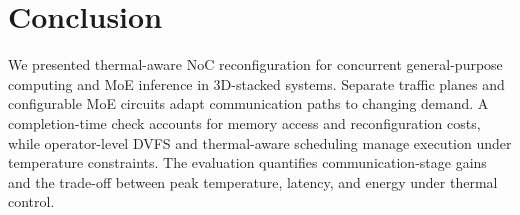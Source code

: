 \documentclass[conference,10pt]{IEEEtran}
\begin{document}
\par\addvspace{5pt}
\section{Conclusion}
\label{sec:conclusion}

We presented thermal-aware NoC reconfiguration for concurrent
general-purpose computing and MoE inference in 3D-stacked systems.
Separate traffic planes and configurable MoE circuits adapt communication
paths to changing demand. A completion-time check accounts for memory
access and reconfiguration costs, while operator-level DVFS and
thermal-aware scheduling manage execution under temperature constraints.
The evaluation quantifies communication-stage gains and the trade-off
between peak temperature, latency, and energy under thermal control.

\balance


\end{document}
